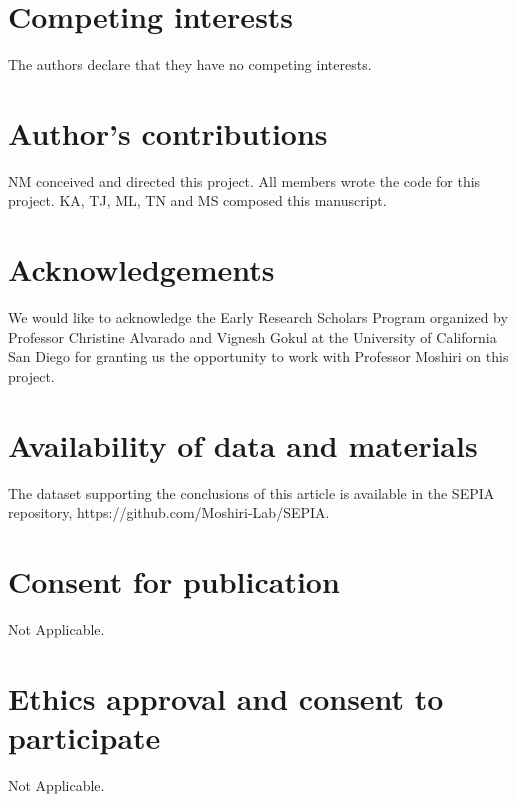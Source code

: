 \documentclass[twocolumn]{bmcart}%
\begin{document}
\begin{multicols}
\begin{backmatter}
\section*{Competing interests}
  The authors declare that they have no competing interests.

\section*{Author's contributions}
    NM conceived and directed this project. All members wrote the code for this project. KA, TJ, ML, TN and MS composed this manuscript.
    
\section*{Acknowledgements}
  We would like to acknowledge the Early Research Scholars Program organized by Professor Christine Alvarado and Vignesh Gokul at the University of California San Diego for granting us the opportunity to work with Professor Moshiri on this project.
  
\section*{Availability of data and materials}
    The dataset supporting the conclusions of this article is available in the SEPIA repository, https://github.com/Moshiri-Lab/SEPIA.

\section*{Consent for publication}
    Not Applicable.
    
\section*{Ethics approval and consent to participate}
    Not Applicable.
    

\end{backmatter}
\end{multicols}
\end{document}

